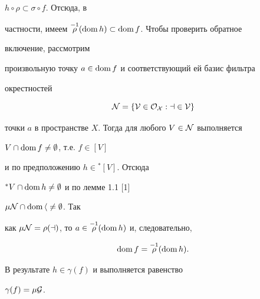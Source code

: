\begin{pf}
$h\circ \rho\subset\sigma\circ f$. Отсюда, в


частности, имеем $\overset{-1}{\rho}{} (\operatorname{dom} h)\subset\operatorname{dom} f$. Чтобы проверить обратное


включение, рассмотрим


произвольную точку $a\in\operatorname{dom} f$ и соответствующий ей базис фильтра


окрестностей


$$


\cal N=\{V\in\cal O_X:a\in V\}


$$


точки $a$ в пространстве $X$. Тогда для любого $V\in\cal N$ выполняется


$V\cap\operatorname{dom} f\ne\emptyset$, т.е. $f\in[V]$


и по предположению $h\in{}^*[V]$. Отсюда


${}^*V\cap\operatorname{dom} h\ne\emptyset$ и по лемме 1.1 [1]


$\mu\cal N\cap\operatorname{dom} h\ne\emptyset$. Так


как $\mu\cal N=\rho(a)$, то $a\in\overset{-1}{\rho}{} (\operatorname{dom} h)$ и, следовательно,


$$


\dom f=\mir (\dom h).


$$


В результате $h\in\gamma(f)$ и выполняется равенство


$\gamma(f)=\mu\cal G$.


\end{pf}





